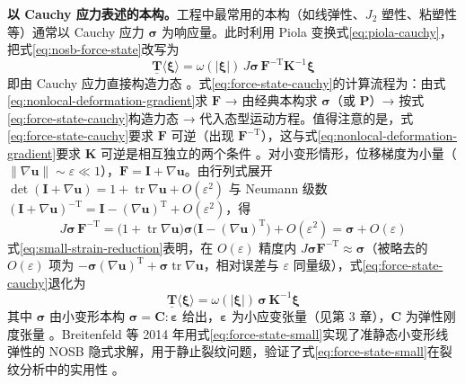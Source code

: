 \textbf{以 Cauchy 应力表述的本构。}工程中最常用的本构（如线弹性、$J_{2}$ 塑性、粘塑性等）通常以 Cauchy 应力 $\boldsymbol{\sigma}$ 为响应量。此时利用 Piola 变换式\eqref{eq:piola-cauchy}，把式\eqref{eq:nosb-force-state}改写为
\begin{equation}
  \underline{\mathbf{T}}\langle\boldsymbol{\xi}\rangle
  =\omega(|\boldsymbol{\xi}|)\,J\boldsymbol{\sigma}\,\mathbf{F}^{-\mathrm{T}}\mathbf{K}^{-1}\boldsymbol{\xi}
  \label{eq:force-state-cauchy}
\end{equation}
即由 Cauchy 应力直接构造力态 \cite{Silling2007,SillingLehoucq2010}。式\eqref{eq:force-state-cauchy}的计算流程为：由式\eqref{eq:nonlocal-deformation-gradient}求 $\mathbf{F}$ → 由经典本构求 $\boldsymbol{\sigma}$（或 $\mathbf{P}$）→ 按式\eqref{eq:force-state-cauchy}构造力态 → 代入态型运动方程。值得注意的是，式\eqref{eq:force-state-cauchy}要求 $\mathbf{F}$ 可逆（出现 $\mathbf{F}^{-\mathrm{T}}$），这与式\eqref{eq:nonlocal-deformation-gradient}要求 $\mathbf{K}$ 可逆是相互独立的两个条件 \cite{Warren2009}。对小变形情形，位移梯度为小量（$\lVert\nabla\mathbf{u}\rVert\sim\varepsilon\ll 1$），$\mathbf{F}=\mathbf{I}+\nabla\mathbf{u}$。由行列式展开 $\det(\mathbf{I}+\nabla\mathbf{u})=1+\operatorname{tr}\nabla\mathbf{u}+O(\varepsilon^{2})$ 与 Neumann 级数 $(\mathbf{I}+\nabla\mathbf{u})^{-\mathrm{T}}=\mathbf{I}-(\nabla\mathbf{u})^{\mathrm{T}}+O(\varepsilon^{2})$，得
\begin{equation}
  J\boldsymbol{\sigma}\,\mathbf{F}^{-\mathrm{T}}
  =\bigl(1+\operatorname{tr}\nabla\mathbf{u}\bigr)\boldsymbol{\sigma}\bigl(\mathbf{I}-(\nabla\mathbf{u})^{\mathrm{T}}\bigr)+O(\varepsilon^{2})
  =\boldsymbol{\sigma}+O(\varepsilon)
  \label{eq:small-strain-reduction}
\end{equation}
式\eqref{eq:small-strain-reduction}表明，在 $O(\varepsilon)$ 精度内 $J\boldsymbol{\sigma}\mathbf{F}^{-\mathrm{T}}\approx\boldsymbol{\sigma}$（被略去的 $O(\varepsilon)$ 项为 $-\boldsymbol{\sigma}(\nabla\mathbf{u})^{\mathrm{T}}+\boldsymbol{\sigma}\operatorname{tr}\nabla\mathbf{u}$，相对误差与 $\varepsilon$ 同量级），式\eqref{eq:force-state-cauchy}退化为
\begin{equation}
  \underline{\mathbf{T}}\langle\boldsymbol{\xi}\rangle
  =\omega(|\boldsymbol{\xi}|)\,\boldsymbol{\sigma}\,\mathbf{K}^{-1}\boldsymbol{\xi}
  \label{eq:force-state-small}
\end{equation}
其中 $\boldsymbol{\sigma}$ 由小变形本构 $\boldsymbol{\sigma}=\mathbf{C}:\boldsymbol{\varepsilon}$ 给出，$\boldsymbol{\varepsilon}$ 为小应变张量（见第 3 章），$\mathbf{C}$ 为弹性刚度张量 \cite{Breitenfeld2014,MadenciOterkus2014}。Breitenfeld 等 2014 年用式\eqref{eq:force-state-small}实现了准静态小变形线弹性的 NOSB 隐式求解，用于静止裂纹问题，验证了式\eqref{eq:force-state-small}在裂纹分析中的实用性 \cite{Breitenfeld2014}。

